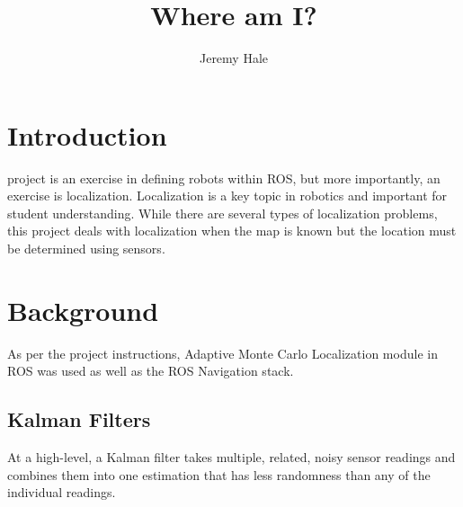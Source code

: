 \documentclass[10pt,journal,compsoc]{IEEEtran}
\begin{document}
\title{Where am I?}

\author{Jeremy Hale}

%
{}


\maketitle
\IEEEdisplaynontitleabstractindextext
\IEEEpeerreviewmaketitle
\section{Introduction}
\label{sec:introduction}

 project is an exercise in defining robots within ROS, but more importantly, an exercise is localization. Localization is a key topic in robotics and important for student understanding. While there are several types of localization problems, this project deals with localization when the map is known but the location must be determined using sensors.

\section{Background}
As per the project instructions, Adaptive Monte Carlo Localization module in ROS was used as well as the ROS Navigation stack.

\subsection{Kalman Filters}
At a high-level, a Kalman filter takes multiple, related, noisy sensor readings and combines them into one estimation that has less randomness than any of the individual readings.
\end{document}
